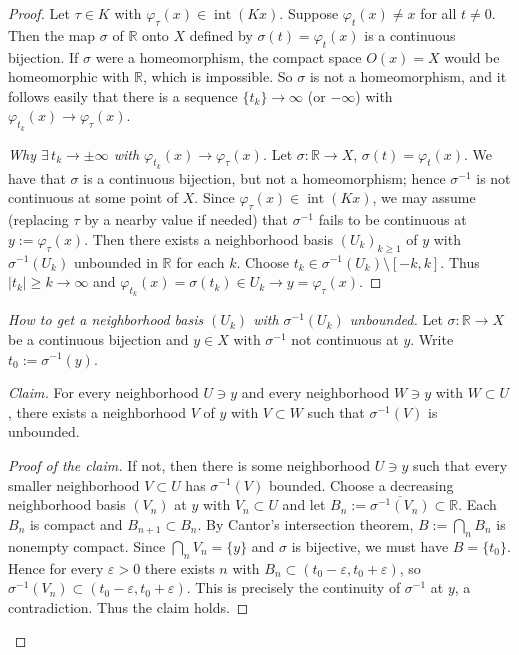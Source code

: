 \begin{proof}
    Let $\tau \in K$ with $\varphi_\tau(x) \in \operatorname{int}(Kx)$. Suppose $\varphi_t(x) \ne x$ for all $t \ne 0$. Then the map $\sigma$ of $\mathbb{R}$ onto $X$ defined by $\sigma(t) = \varphi_t(x)$ is a continuous bijection. If $\sigma$ were a homeomorphism, the compact space $O(x) = X$ would be homeomorphic with $\mathbb{R}$, which is impossible. So $\sigma$ is not a homeomorphism, and it follows easily that there is a sequence $\{t_k\} \to \infty$ (or $-\infty$) with $\varphi_{t_k}(x) \to \varphi_\tau(x)$.
    \begin{mynote}
        \begin{proof}[Why $\exists\,t_k\to\pm\infty$ with $\varphi_{t_k}(x)\to\varphi_\tau(x)$]
            Let $\sigma:\mathbb R\to X$, $\sigma(t)=\varphi_t(x)$. We have that $\sigma$ is a continuous bijection, but not a
            homeomorphism; hence $\sigma^{-1}$ is not continuous at some point of $X$. Since $\varphi_\tau(x)\in\operatorname{int}(Kx)$,
            we may assume (replacing $\tau$ by a nearby value if needed) that $\sigma^{-1}$ fails to be continuous at
            $y:=\varphi_\tau(x)$. Then there exists a neighborhood basis $(U_k)_{k\ge1}$ of $y$ with
            $\sigma^{-1}(U_k)$ unbounded in $\mathbb R$ for each $k$. Choose $t_k\in \sigma^{-1}(U_k)\setminus[-k,k]$.
            Thus $|t_k|\ge k\to\infty$ and $\varphi_{t_k}(x)=\sigma(t_k)\in U_k\to y=\varphi_\tau(x)$.
        \end{proof}
        \begin{proof}[How to get a neighborhood basis $(U_k)$ with $\sigma^{-1}(U_k)$ unbounded]
            Let $\sigma:\mathbb R\to X$ be a continuous bijection and $y\in X$ with $\sigma^{-1}$ not continuous at $y$.
            Write $t_0:=\sigma^{-1}(y)$.

            \emph{Claim.} For every neighborhood $U\ni y$ and every neighborhood $W\ni y$ with $W\subset U$,
            there exists a neighborhood $V$ of $y$ with $V\subset W$ such that $\sigma^{-1}(V)$ is unbounded.

            \emph{Proof of the claim.}
            If not, then there is some neighborhood $U\ni y$ such that every smaller neighborhood
            $V\subset U$ has $\sigma^{-1}(V)$ bounded.
            Choose a decreasing neighborhood basis $(V_n)$ at $y$ with $V_n\subset U$ and
            let $B_n:=\overline{\sigma^{-1}(V_n)}\subset\mathbb R$.
            Each $B_n$ is compact and $B_{n+1}\subset B_n$.
            By Cantor’s intersection theorem, $B:=\bigcap_n B_n$ is nonempty compact.
            Since $\bigcap_n V_n=\{y\}$ and $\sigma$ is bijective, we must have $B=\{t_0\}$.
            Hence for every $\varepsilon>0$ there exists $n$ with $B_n\subset (t_0-\varepsilon,t_0+\varepsilon)$,
            so $\sigma^{-1}(V_n)\subset (t_0-\varepsilon,t_0+\varepsilon)$.
            This is precisely the continuity of $\sigma^{-1}$ at $y$, a contradiction.
            Thus the claim holds. \qedhere


\end{proof}
\end{mynote}
\end{proof}
